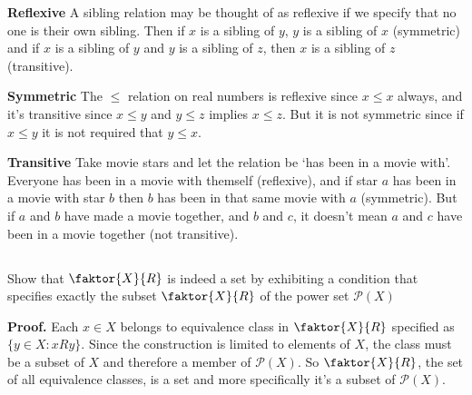 \documentclass{article}
\begin{document}
\begin{enumerate}[i]
\textbf{Reflexive} A sibling relation may be thought of as reflexive if we specify that no one is their own sibling. Then if $x$ is a sibling of $y$, $y$ is a sibling of $x$ (symmetric) and if $x$ is a sibling of $y$ and $y$ is a sibling of $z$, then $x$ is a sibling of $z$ (transitive).

\textbf{Symmetric} The $\leq$ relation on real numbers is reflexive since $x \leq x$ always, and it's transitive since $x \leq y$ and $y \leq z$ implies $x \leq z$. But it is not symmetric since if $x \leq y$ it is not required that $y \leq x$. 

\textbf{Transitive} Take movie stars and let the relation be `has been in a movie with'. Everyone has been in a movie with themself (reflexive), and if star $a$ has been in a movie with star $b$ then $b$ has been in that same movie with $a$ (symmetric). But if $a$ and $b$ have made a movie together, and $b$ and $c$, it doesn't mean $a$ and $c$ have been in a movie together (not transitive).

\subsection{} Show that $\faktor{X}{R}$ is indeed a set by exhibiting a condition that specifies exactly the subset $\faktor{X}{R}$ of the power set $\mathscr{P}(X)$

\textbf{Proof.} Each $x \in X$ belongs to equivalence class in $\faktor{X}{R}$ specified as $\{y \in X: xRy\}$. Since the construction is limited to elements of $X$, the class must be a subset of $X$ and therefore a member of $\mathscr{P}(X)$. So $\faktor{X}{R}$, the set of all equivalence classes, is a set and more specifically it's a subset of $\mathscr{P}(X)$.
\end{enumerate}
\end{document}
